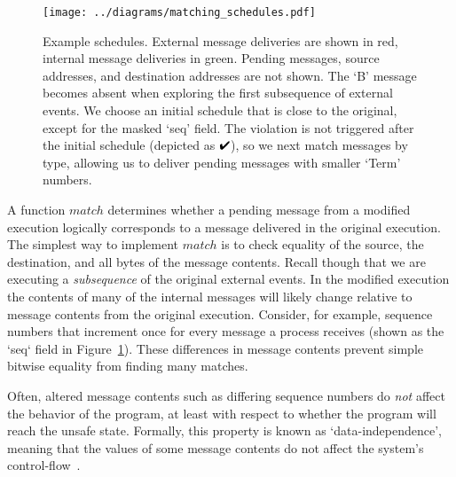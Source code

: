 \begin{figure}[tb!]
    \centering
    \texttt{[image: ../diagrams/matching\_schedules.pdf]}
    \caption{\label{fig:matching} Example schedules. External
    message deliveries are shown in red, internal message deliveries in green. Pending
    messages, source addresses, and destination addresses are not shown. The `B' message
    becomes absent when exploring the first subsequence of external
    events. We choose an initial schedule that is close to the original,
    except for the masked `seq' field. The violation is not triggered after
    the initial schedule (depicted as $\PASS$), so we next match messages by type,
    allowing us to deliver pending messages with smaller `Term' numbers.}%
\end{figure}


 A function $match$ determines whether a
pending message from a modified execution logically corresponds to a
message delivered in the original execution. The simplest way to implement
$match$ is to
check equality of the source, the destination, and all bytes of the message
contents. Recall though that we are executing a
{\em subsequence} of the original external events.
In the modified execution the contents of many of the
internal messages will likely change relative to message contents from the original execution. Consider, for example, sequence numbers
that increment once for every message a process receives (shown as the `seq` field in Figure~\ref{fig:matching}). These differences in
message contents prevent simple bitwise equality from finding
many matches.

 Often, altered message
contents such as differing sequence numbers do {\em not} affect the behavior of the
program, at least with respect to whether the program will reach the
unsafe state. Formally, this property is known as
`data-independence', meaning that the values of some message contents
do not affect the system's control-flow~\cite{shacham2014verifying,wolper}.


